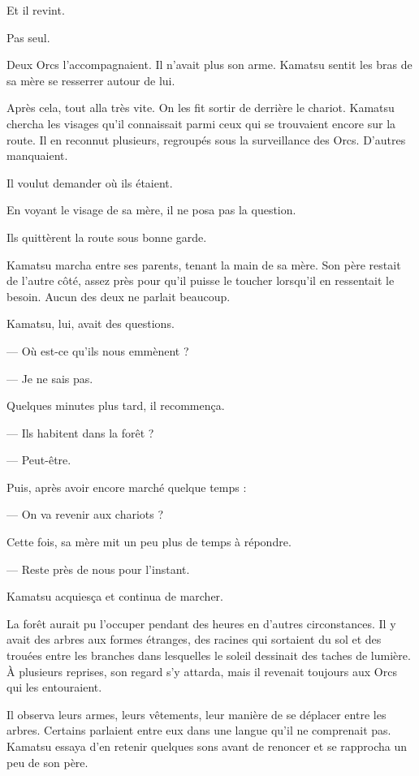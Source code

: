 Et il revint.

Pas seul.

Deux Orcs l'accompagnaient. Il n'avait plus son arme. Kamatsu sentit les bras
de sa mère se resserrer autour de lui.

Après cela, tout alla très vite. On les fit sortir de derrière le chariot.
Kamatsu chercha les visages qu'il connaissait parmi ceux qui se trouvaient
encore sur la route. Il en reconnut plusieurs, regroupés sous la surveillance
des Orcs. D'autres manquaient.

Il voulut demander où ils étaient.

En voyant le visage de sa mère, il ne posa pas la question.

\scenebreak

Ils quittèrent la route sous bonne garde.

Kamatsu marcha entre ses parents, tenant la main de sa mère. Son père restait
de l'autre côté, assez près pour qu'il puisse le toucher lorsqu'il en
ressentait le besoin. Aucun des deux ne parlait beaucoup.

Kamatsu, lui, avait des questions.

— Où est-ce qu'ils nous emmènent ?

— Je ne sais pas.

Quelques minutes plus tard, il recommença.

— Ils habitent dans la forêt ?

— Peut-être.

Puis, après avoir encore marché quelque temps :

— On va revenir aux chariots ?

Cette fois, sa mère mit un peu plus de temps à répondre.

— Reste près de nous pour l'instant.

Kamatsu acquiesça et continua de marcher.

La forêt aurait pu l'occuper pendant des heures en d'autres circonstances. Il
y avait des arbres aux formes étranges, des racines qui sortaient du sol et
des trouées entre les branches dans lesquelles le soleil dessinait des taches
de lumière. À plusieurs reprises, son regard s'y attarda, mais il revenait
toujours aux Orcs qui les entouraient.

Il observa leurs armes, leurs vêtements, leur manière de se déplacer entre les
arbres. Certains parlaient entre eux dans une langue qu'il ne comprenait pas.
Kamatsu essaya d'en retenir quelques sons avant de renoncer et se rapprocha un
peu de son père.

